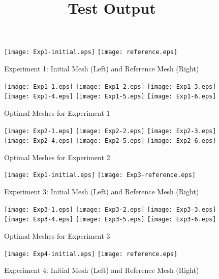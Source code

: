 \documentclass[letter]{report}
\title{ Test Output }
\begin{document}
\begin{figure}[!h]
\caption{Experiment 1: Initial Mesh (Left) and Reference Mesh (Right)}
\texttt{[image: Exp1-initial.eps]}
\texttt{[image: reference.eps]}
\end{figure}

\begin{figure}[!h]
\caption{Optimal Meshes for Experiment 1}
\texttt{[image: Exp1-1.eps]}
\texttt{[image: Exp1-2.eps]}
\texttt{[image: Exp1-3.eps]}
\texttt{[image: Exp1-4.eps]}
\texttt{[image: Exp1-5.eps]}
\texttt{[image: Exp1-6.eps]}
\end{figure}

\begin{figure}[!h]
\caption{Optimal Meshes for Experiment 2}
\texttt{[image: Exp2-1.eps]}
\texttt{[image: Exp2-2.eps]}
\texttt{[image: Exp2-3.eps]}
\texttt{[image: Exp2-4.eps]}
\texttt{[image: Exp2-5.eps]}
\texttt{[image: Exp2-6.eps]}
\end{figure}

\begin{figure}[!h]
\caption{Experiment 3: Initial Mesh (Left) and Reference Mesh (Right)}
\texttt{[image: Exp1-initial.eps]}
\texttt{[image: Exp3-reference.eps]}
\end{figure}

\begin{figure}[!h]
\caption{Optimal Meshes for Experiment 3}
\texttt{[image: Exp3-1.eps]}
\texttt{[image: Exp3-2.eps]}
\texttt{[image: Exp3-3.eps]}
\texttt{[image: Exp3-4.eps]}
\texttt{[image: Exp3-5.eps]}
\texttt{[image: Exp3-6.eps]}
\end{figure}

\begin{figure}[!h]
\caption{Experiment 4: Initial Mesh (Left) and Reference Mesh (Right)}
\texttt{[image: Exp4-initial.eps]}
\texttt{[image: reference.eps]}
\end{figure}
\end{document}
